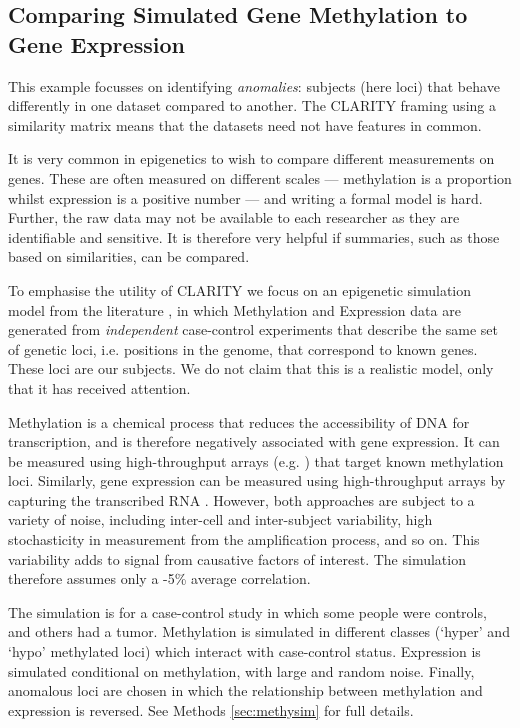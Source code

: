 \documentclass[a4]{article}
\newcommand{\+}[1]{\mathbf{#1}}
\begin{document}
\subsection{Comparing Simulated Gene Methylation to Gene Expression}
\label{sec:epigenetics}

This example focusses on identifying \emph{anomalies}: subjects (here loci) that behave differently in one dataset compared to another. The CLARITY framing using a similarity matrix means that the datasets need not have features in common.

It is very common in epigenetics to wish to compare different measurements on genes. These are often measured on different scales --- methylation is a proportion whilst expression is a positive number --- and writing a formal model is hard. Further, the raw data may not be available to each researcher as they are identifiable and sensitive. It is therefore very helpful if summaries, such as those based on similarities, can be compared.

To emphasise the utility of CLARITY we focus on an epigenetic simulation model from the literature \cite{gu2016complex}, in which Methylation and Expression data are generated from \emph{independent} case-control experiments that describe the same set of genetic loci, i.e. positions in the genome, that correspond to known genes. These loci are our subjects.
We do not claim that this is a realistic model, only that it has received attention.

Methylation is a chemical process that reduces the accessibility of DNA for transcription, and is therefore negatively associated with gene expression. It can be measured using high-throughput arrays (e.g. \cite{bibikova_high_2011,min_genomic_2020}) that target known methylation loci. Similarly, gene expression can be measured using high-throughput arrays by capturing the transcribed RNA \cite{lockhart_genomics_2000}. However, both approaches are subject to a variety of noise, including inter-cell and inter-subject variability, high stochasticity in measurement from the amplification process, and so on. This variability adds to signal from causative factors of interest. The simulation therefore assumes only a -5\% average correlation.

The simulation is for a case-control study in which some people were controls, and others had a tumor. Methylation is simulated in different classes (`hyper' and `hypo' methylated loci) which interact with case-control status. Expression is simulated conditional on methylation, with large and random noise. Finally, anomalous loci are chosen in which the relationship between methylation and expression is reversed. See Methods \ref{sec:methysim} for full details.
\end{document}
